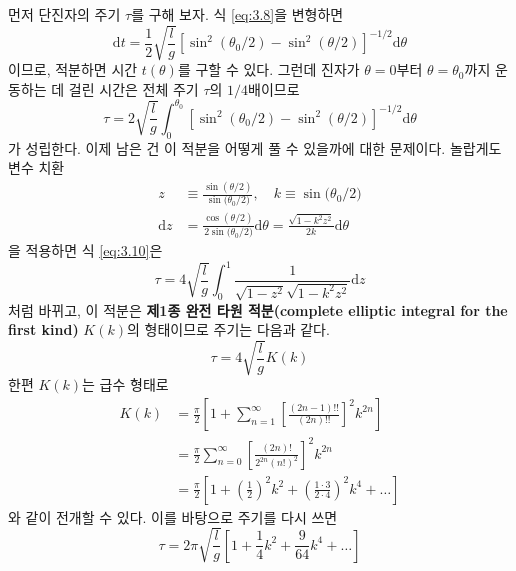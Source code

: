 \documentclass[chapter, oneside, b5paper]{oblivoir}
\theoremstyle{plain}
\theoremstyle{definition}
\theoremstyle{remark}
\begin{document}
먼저 단진자의 주기 $\tau$를 구해 보자. 식 \ref{eq:3.8}을 변형하면
\begin{equation}
    \mathrm{d}t = \frac{1}{2}\sqrt{\frac{l}{g}}[\sin^2{(\theta_0/2)} - \sin^2{(\theta / 2)}]^{-1/2} \mathrm{d}\theta
    \label{eq:3.9}
\end{equation}이므로, 적분하면 시간 $t(\theta)$를 구할 수 있다. 그런데 진자가 $\theta=0$부터 $\theta=\theta_0$까지 운동하는 데 걸린 시간은 전체 주기 $\tau$의 $1/4$배이므로
\begin{equation}
    \tau = 2\sqrt{\frac{l}{g}} \int_{0}^{\theta_0}[\sin^2{(\theta_0/2)} - \sin^2{(\theta / 2)}]^{-1/2} \mathrm{d}\theta
    \label{eq:3.10}
\end{equation}
가 성립한다. 이제 남은 건 이 적분을 어떻게 풀 수 있을까에 대한 문제이다. 놀랍게도 변수 치환
\begin{equation*}
\begin{aligned}
    z &\equiv \frac{\sin{(\theta/2)}}{\sin{(\theta_0/2})}, \quad k \equiv \sin{(\theta_0/2}) \\
    \mathrm{d}z &= \frac{\cos{(\theta/2)}}{2\sin{(\theta_0/2})}\mathrm{d}\theta = \frac{\sqrt{1-k^2z^2}}{2k}\mathrm{d}\theta
\end{aligned}
\end{equation*}
을 적용하면 식 \ref{eq:3.10}은
\begin{equation}
    \tau = 4\sqrt{\frac{l}{g}} \int_0^1 \frac{1}{\sqrt{1-z^2}\sqrt{1-k^2z^2}}\mathrm{d}z
\end{equation}
처럼 바뀌고, 이 적분은 \textbf{제1종 완전 타원 적분(complete elliptic integral for the first kind)} $K(k)$의 형태이므로 주기는 다음과 같다.
\begin{equation}
    \tau = 4\sqrt{\frac{l}{g}}K(k)
\end{equation}
한편 $K(k)$는 급수 형태로
\begin{equation}
    \begin{aligned} K(k) &=\frac{\pi}{2} \left[1+ \sum_{n=1}^{\infty }\left [ \frac{(2n-1)!!}{(2n)!!} \right ]^{2}{k^{2n}} \right]\\& =\frac{\pi}{2} \sum_{n=0}^{\infty }\left [ \frac{(2n)!}{2^{2n}\left(n!\right)^{2}} \right ]^{2}k^{2n} \\
    &= \frac{\pi}{2}\left[1+ \left(\frac{1}{2}\right)^2 k^2 + \left( \frac{1 \cdot 3}{2 \cdot 4} \right)^2 k^4 + \dots \right]
    \end{aligned}
    \label{eq:3.13}
\end{equation}
와 같이 전개할 수 있다. 이를 바탕으로 주기를 다시 쓰면
\begin{equation}
    \tau = 2\pi \sqrt{\frac{l}{g}} \left[1+ \frac{1}{4} k^2 + \frac{9}{64} k^4 + \dots \right]
\end{equation}
\end{document}
